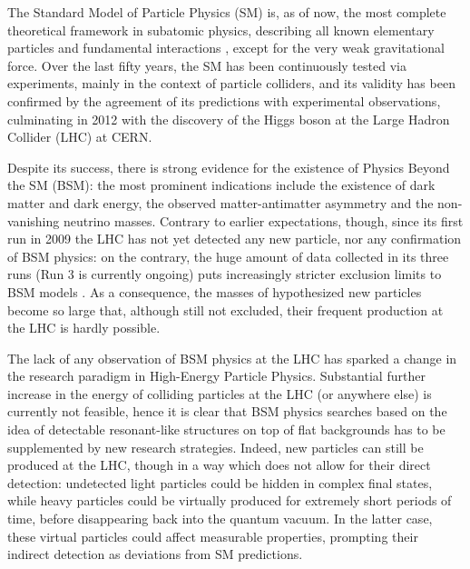 
The Standard Model of Particle Physics (SM) is, as of now, the most complete theoretical framework in subatomic physics, describing all known elementary particles and fundamental interactions \cite{Glashow-1961, Salam-1964, Weinberg-1967, Fritzsch-1972, Fritzsch-1973, Higgs-1964-1, Higgs-1964-2, Englert-1964, Guralnik-1964}, except for the very weak gravitational force. Over the last fifty years, the SM has been continuously tested via experiments, mainly in the context of particle colliders, and its validity has been confirmed by the agreement of its predictions with experimental observations, culminating in 2012 with the discovery of the Higgs boson \cite{ATLAS-2012, CMS-2012} at the Large Hadron Collider (LHC) at CERN.

Despite its success, there is strong evidence for the existence of Physics Beyond the SM (BSM): the most prominent indications include the existence of dark matter and dark energy, the observed matter-antimatter asymmetry and the non-vanishing neutrino masses. Contrary to earlier expectations, though, since its first run in 2009 the LHC has not yet detected any new particle, nor any confirmation of BSM physics: on the contrary, the huge amount of data collected in its three runs (Run 3 is currently ongoing) puts increasingly stricter exclusion limits to BSM models \cite{CMS-ATLAS-SUSY, Bsekidt-2012, Ghosh-2025, Crivellin-2015}. As a consequence, the masses of hypothesized new particles become so large that, although still not excluded, their frequent production at the LHC is hardly possible.

The lack of any observation of BSM physics at the LHC has sparked a change in the research paradigm in High-Energy Particle Physics. Substantial further increase in the energy of colliding particles at the LHC (or anywhere else) is currently not feasible, hence it is clear that BSM physics searches based on the idea of detectable resonant-like structures on top of flat backgrounds has to be supplemented by new research strategies. Indeed, new particles can still be produced at the LHC, though in a way which does not allow for their direct detection: undetected light particles could be hidden in complex final states, while heavy particles could be virtually produced for extremely short periods of time, before disappearing back into the quantum vacuum. In the latter case, these virtual particles could affect measurable properties, prompting their indirect detection as deviations from SM predictions.

